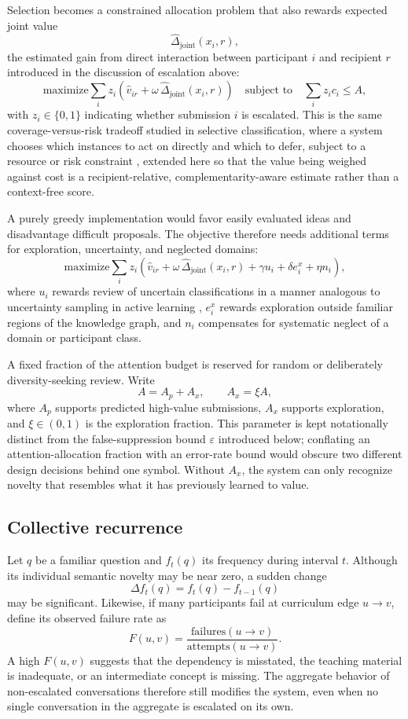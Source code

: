 \documentclass[11pt]{article}
\begin{document}
Selection becomes a constrained allocation problem that also rewards expected joint value
\[
\widehat{\Delta}_{\mathrm{joint}}(x_i,r),
\]
the estimated gain from direct interaction between participant $i$ and recipient $r$ introduced in the discussion of escalation above:
\[
\text{maximize} \sum_i z_i \left(\widehat{v}_{ir} + \omega\,\widehat{\Delta}_{\mathrm{joint}}(x_i,r)\right) \quad \text{subject to} \quad \sum_i z_i c_i \leq A,
\]
with $z_i \in \{0,1\}$ indicating whether submission $i$ is escalated. This is the same coverage-versus-risk tradeoff studied in selective classification, where a system chooses which instances to act on directly and which to defer, subject to a resource or risk constraint \cite{geifman2017}, extended here so that the value being weighed against cost is a recipient-relative, complementarity-aware estimate rather than a context-free score.

A purely greedy implementation would favor easily evaluated ideas and disadvantage difficult proposals. The objective therefore needs additional terms for exploration, uncertainty, and neglected domains:
\[
\text{maximize} \sum_i z_i \left( \widehat{v}_{ir} + \omega\,\widehat{\Delta}_{\mathrm{joint}}(x_i,r) + \gamma u_i + \delta e_i^x + \eta n_i \right),
\]
where $u_i$ rewards review of uncertain classifications in a manner analogous to uncertainty sampling in active learning \cite{settles2009}, $e_i^x$ rewards exploration outside familiar regions of the knowledge graph, and $n_i$ compensates for systematic neglect of a domain or participant class.

A fixed fraction of the attention budget is reserved for random or deliberately diversity-seeking review. Write
\[
A = A_p + A_x, \qquad A_x = \xi A,
\]
where $A_p$ supports predicted high-value submissions, $A_x$ supports exploration, and $\xi \in (0,1)$ is the exploration fraction. This parameter is kept notationally distinct from the false-suppression bound $\varepsilon$ introduced below; conflating an attention-allocation fraction with an error-rate bound would obscure two different design decisions behind one symbol. Without $A_x$, the system can only recognize novelty that resembles what it has previously learned to value.

\subsection{Collective recurrence}

Let $q$ be a familiar question and $f_t(q)$ its frequency during interval $t$. Although its individual semantic novelty may be near zero, a sudden change
\[
\Delta f_t(q) = f_t(q) - f_{t-1}(q)
\]
may be significant. Likewise, if many participants fail at curriculum edge $u \to v$, define its observed failure rate as
\[
F(u, v) = \frac{\mathrm{failures}(u \to v)}{\mathrm{attempts}(u \to v)}.
\]
A high $F(u, v)$ suggests that the dependency is misstated, the teaching material is inadequate, or an intermediate concept is missing. The aggregate behavior of non-escalated conversations therefore still modifies the system, even when no single conversation in the aggregate is escalated on its own.
\end{document}
